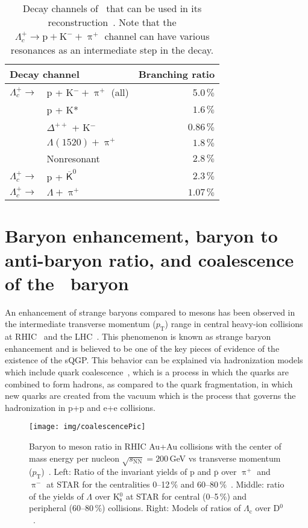 \begin{table}[htb]
\caption{\label{tab:lcDecayCahnnels}Decay channels of \Lambdac\ that can be used in its reconstruction~\cite{PDG}. Note that the $\Lambda_c^+ \rightarrow \mathrm{p} + \mathrm{K}^- + \uppi^+$ channel can have various resonances as an intermediate step in the decay.}
\begin{center}
\begin{tabular}{llr}
\toprule
\multicolumn{2}{l}{Decay channel} & Branching ratio \\
\midrule
$\Lambda_c^+ \rightarrow$ &  p + K$^- + \uppi^+$ (all) & 5.0$\,\%$ \\
  & p + K* & $1.6\,\%$ \\
  & $\Delta^{++}$ + K$^-$ & $0.86\,\%$ \\
  & $\Lambda(1520) + \uppi^+$ & $1.8\,\%$ \\
  & Nonresonant & $2.8\,\%$ \\
$\Lambda_c^+ \rightarrow$ &  p + $\overline{\mathsf{K}}^0$ & $2.3\,\% $ \\
$\Lambda_c^+ \rightarrow$ & $ \Lambda + \uppi^+$ & $1.07\,\%$ \\
\bottomrule
\end{tabular}
\end{center}
\end{table}




\section{Baryon enhancement, baryon to anti-baryon ratio, and coalescence of the \Lambdac\ baryon}

An enhancement of strange baryons compared to mesons has been observed in the intermediate transverse momentum ($p_\mathrm{T}$) range in central heavy-ion collisions at RHIC~\cite{STARLambda} and the LHC~\cite{LambdaALICE}\@. This phenomenon is known as strange baryon enhancement and is believed to be one of the key pieces of evidence of the existence of the sQGP\@. This behavior can be explained via hadronization models which include quark coalescence~\cite{coalescenceKrakow,coalescenceKFKI}, which is a process in which the quarks are combined to form hadrons, as compared to the quark fragmentation, in which new quarks are created from the vacuum which is the process that governs the hadronization in p+p and e+e collisions.  

\begin{figure}
\centering
\texttt{[image: img/coalescencePic]}
\caption{Baryon to meson ratio in RHIC Au+Au collisions with the center of mass energy per nucleon $\sqrt{s_\mathrm{NN}} = 200\,$GeV vs transverse momentum ($p_\mathrm{T}$)~\cite{GuannanLc}\@. Left: Ratio of the invariant yields of p and $\overline{\mathrm{p}}$ over $\uppi^+$ and $\uppi^-$ at STAR for the centralities 0--12$\,\%$ and 60--80$\,\%$~\cite{STARLambda}. Middle: ratio of the yields of $\Lambda$ over K$^0_\mathrm{s}$ at STAR for central (0--5$\,\%$) and peripheral (60--80$\,\%$) collisions. Right: Models of ratios of $\Lambda_\mathrm{c}$ over D$^0$~\cite{LcCoalescence_OhKoLeeYasui, Ghosh_Lc_rescattering, SHM}.}
\label{fig:LambdaKzero}
\end{figure}

